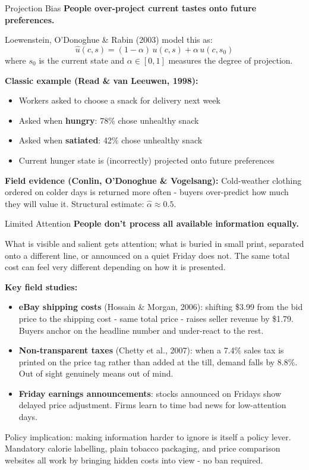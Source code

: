 \documentclass[10pt]{beamer}
\begin{document}
\begin{frame}{Projection Bias}
\textbf{People over-project current tastes onto future preferences.}


Loewenstein, O'Donoghue \& Rabin (2003) model this as:
\[
\hat{u}(c, s) = (1-\alpha)\,u(c, s) + \alpha\,u(c, s_0)
\]
where $s_0$ is the current state and $\alpha \in [0,1]$ measures the degree of projection.


\textbf{Classic example (Read \& van Leeuwen, 1998):}
\begin{itemize}
\item Workers asked to choose a snack for delivery next week
\item Asked when \textbf{hungry}: 78\% chose unhealthy snack
\item Asked when \textbf{satiated}: 42\% chose unhealthy snack
\item Current hunger state is (incorrectly) projected onto future preferences
\end{itemize}


\textbf{Field evidence (Conlin, O'Donoghue \& Vogelsang):}
Cold-weather clothing ordered on colder days is \alert{returned more often} - buyers over-predict how much they will value it.
Structural estimate: $\hat\alpha \approx 0.5$.
\end{frame}


\begin{frame}[allowframebreaks]{Limited Attention}
\textbf{People don't process all available information equally.}

What is visible and salient gets attention; what is buried in small print,
separated onto a different line, or announced on a quiet Friday does not.
The same total cost can feel very different depending on how it is presented.

\vspace{0.2cm}
\textbf{Key field studies:}
\begin{itemize}
\item \textbf{eBay shipping costs} (Hossain \& Morgan, 2006): shifting \$3.99
from the bid price to the shipping cost - same total price - raises seller
revenue by \$1.79. Buyers anchor on the headline number and under-react to the rest.

\item \textbf{Non-transparent taxes} (Chetty et al., 2007): when a 7.4\% sales
tax is printed on the price tag rather than added at the till, demand falls by
8.8\%. Out of sight genuinely means out of mind.

\item \textbf{Friday earnings announcements}: stocks announced on Fridays show
delayed price adjustment. Firms learn to time bad news for low-attention days.
\end{itemize}

\alert{Policy implication:} making information harder to ignore is itself a policy
lever. Mandatory calorie labelling, plain tobacco packaging, and price comparison
websites all work by bringing hidden costs into view - no ban required.
\end{frame}
\end{document}
